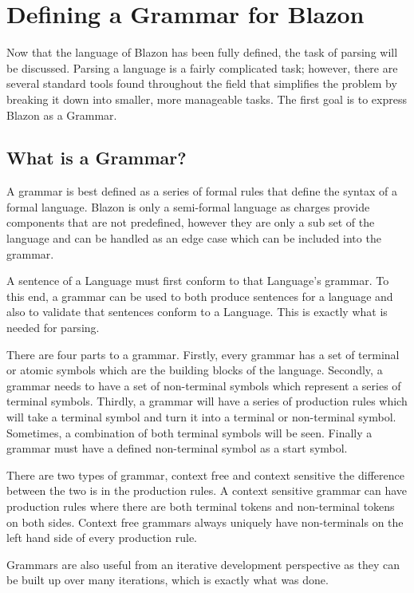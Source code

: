 \chapter{Defining a Grammar for Blazon}

Now that the language of Blazon has been fully defined, the task of parsing will be discussed.  Parsing a language is a fairly complicated task; however, there are several standard tools found throughout the field that simplifies the problem by breaking it down into smaller, more manageable tasks. The first goal is to express Blazon as a Grammar. 


\section{What is a Grammar?}
A grammar is best defined as a series of formal rules that define the syntax of a formal language.  Blazon is only a semi-formal language as charges provide components that are not predefined, however they are only a sub set of the language and can be handled as an edge case which can be included into the grammar.  

A sentence of a Language must first conform to that Language's grammar.  To this end, a grammar can be used to both produce sentences for a language and also to validate that sentences conform to a Language. This is exactly what is needed for parsing. 


There are four parts to a grammar.  Firstly, every grammar has a set of terminal or atomic symbols which are the building blocks of the language.  Secondly, a grammar needs to have a set of non-terminal symbols which represent a series of terminal symbols.  Thirdly, a grammar will have a series of production rules which will take a terminal symbol and turn it into a terminal or non-terminal symbol. Sometimes, a combination of both terminal symbols will be seen. Finally a grammar must have a defined non-terminal symbol as a start symbol.



There are two types of grammar, context free and context sensitive the difference between the two is in the production rules.  A context sensitive grammar can have production rules where there are both terminal tokens and non-terminal tokens on both sides. Context free grammars always uniquely have non-terminals on the left hand side of every production rule. 

Grammars are also useful from an iterative development perspective as they can be built up over many iterations, which is exactly what was done.  

